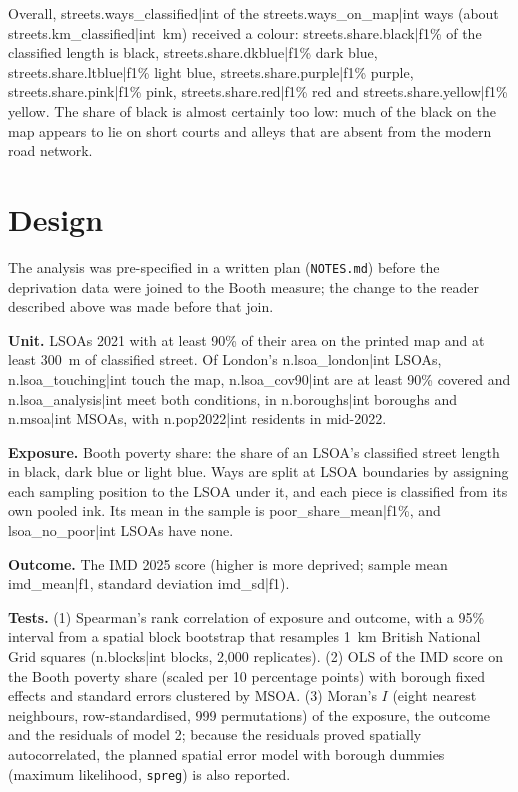 
Overall, {{streets.ways_classified|int}} of the {{streets.ways_on_map|int}} ways (about {{streets.km_classified|int}}~km) received a colour: {{streets.share.black|f1}}\% of the classified length is black, {{streets.share.dkblue|f1}}\% dark blue, {{streets.share.ltblue|f1}}\% light blue, {{streets.share.purple|f1}}\% purple, {{streets.share.pink|f1}}\% pink, {{streets.share.red|f1}}\% red and {{streets.share.yellow|f1}}\% yellow. The share of black is almost certainly too low: much of the black on the map appears to lie on short courts and alleys that are absent from the modern road network.

\section{Design}\label{sec:design}

The analysis was pre-specified in a written plan (\texttt{NOTES.md}) before the deprivation data were joined to the Booth measure; the change to the reader described above was made before that join.

\textbf{Unit.} LSOAs 2021 with at least 90\% of their area on the printed map and at least 300~m of classified street. Of London's {{n.lsoa_london|int}} LSOAs, {{n.lsoa_touching|int}} touch the map, {{n.lsoa_cov90|int}} are at least 90\% covered and {{n.lsoa_analysis|int}} meet both conditions, in {{n.boroughs|int}} boroughs and {{n.msoa|int}} MSOAs, with {{n.pop2022|int}} residents in mid-2022.

\textbf{Exposure.} Booth poverty share: the share of an LSOA's classified street length in black, dark blue or light blue. Ways are split at LSOA boundaries by assigning each sampling position to the LSOA under it, and each piece is classified from its own pooled ink. Its mean in the sample is {{poor_share_mean|f1}}\%, and {{lsoa_no_poor|int}} LSOAs have none.

\textbf{Outcome.} The IMD 2025 score (higher is more deprived; sample mean {{imd_mean|f1}}, standard deviation {{imd_sd|f1}}).

\textbf{Tests.} (1) Spearman's rank correlation of exposure and outcome, with a 95\% interval from a spatial block bootstrap that resamples 1~km British National Grid squares ({{n.blocks|int}} blocks, 2,000 replicates). (2) OLS of the IMD score on the Booth poverty share (scaled per 10 percentage points) with borough fixed effects and standard errors clustered by MSOA. (3) Moran's $I$ (eight nearest neighbours, row-standardised, 999 permutations) of the exposure, the outcome and the residuals of model 2; because the residuals proved spatially autocorrelated, the planned spatial error model with borough dummies (maximum likelihood, \texttt{spreg}) is also reported.

